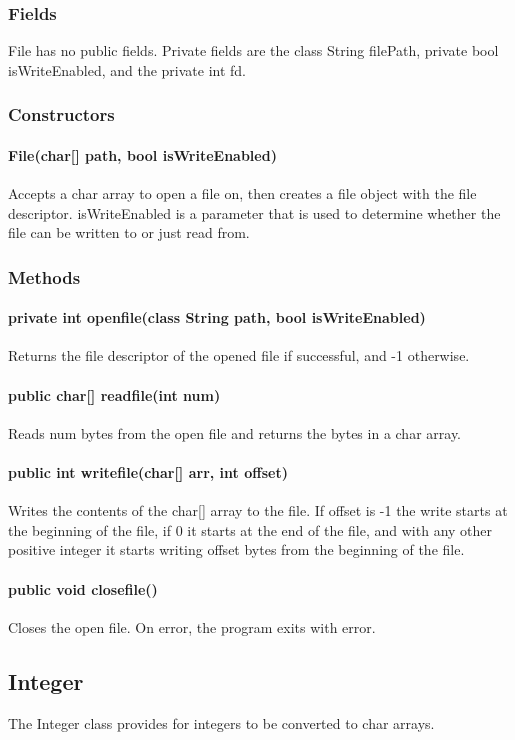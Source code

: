 \begin{homeworkProblem}
	\subsubsection{Fields}
	File has no public fields. Private fields are the class String filePath, private bool isWriteEnabled, and the private int fd.
	
	\subsubsection{Constructors}
	\paragraph{File(char[] path, bool isWriteEnabled)}
	Accepts a char array to open a file on, then creates a file object with the file descriptor. isWriteEnabled is a parameter that is used to determine whether the file can be written to or just read from.
	
	\subsubsection{Methods}
	\paragraph{private int openfile(class String path, bool isWriteEnabled)}
	Returns the file descriptor of the opened file if successful, and -1 otherwise. 
	\paragraph{public char[] readfile(int num)}
	Reads num bytes from the open file and returns the bytes in a char array.
	\paragraph{public int writefile(char[] arr, int offset)}
	Writes the contents of the char[] array to the file. If offset is -1 the write starts at the beginning of the file, if 0 it starts at the end of the file, and with any other positive integer it starts writing offset bytes from the beginning of the file.
	\paragraph{public void closefile()}
	Closes the open file. On error, the program exits with error.
	
	\subsection{Integer}
	The Integer class provides for integers to be converted to char arrays.

\end{homeworkProblem}
